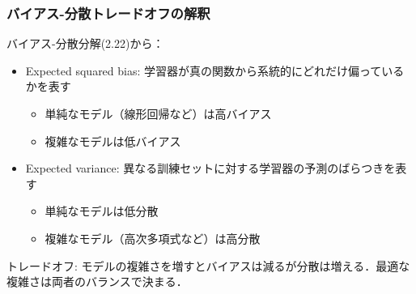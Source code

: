 \documentclass[dvipdfmx,cjk]{beamer}
\theoremstyle{example}
\begin{document}
\begin{frame}
    \frametitle{バイアス-分散トレードオフの解釈}
    バイアス-分散分解(2.22)から：

    \begin{itemize}
        \item \alert{Expected squared bias}: 学習器が真の関数から系統的にどれだけ偏っているかを表す
              \begin{itemize}
                  \item 単純なモデル（線形回帰など）は高バイアス
                  \item 複雑なモデルは低バイアス
              \end{itemize}

        \item \alert{Expected variance}: 異なる訓練セットに対する学習器の予測のばらつきを表す
              \begin{itemize}
                  \item 単純なモデルは低分散
                  \item 複雑なモデル（高次多項式など）は高分散
              \end{itemize}
    \end{itemize}

    \vspace{0.5cm}
    \alert{トレードオフ}: モデルの複雑さを増すとバイアスは減るが分散は増える．最適な複雑さは両者のバランスで決まる．
\end{frame}
\end{document}
